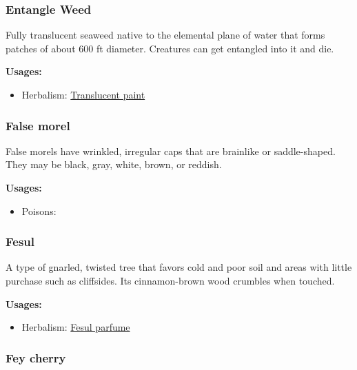 \subsubsection{Entangle Weed}
\label{Entangle Weed}

Fully translucent seaweed native to the elemental plane of water that forms patches of about 600 ft diameter. Creatures can get entangled into it and die.

\vspace{5mm}

\textbf{Usages:}

\begin{itemize}[noitemsep]
\item[] Herbalism: \hyperref[Translucent paint]{Translucent paint}
\end{itemize}

\subsubsection{False morel}
\label{False Morel}

False morels have wrinkled, irregular caps that are brainlike or saddle-shaped. They may be black, gray, white, brown, or reddish.

\vspace{5mm}

\textbf{Usages:}

\begin{itemize}[noitemsep]
\item[] Poisons: \poison
\end{itemize}


\subsubsection{Fesul}
\label{Fesul}

A type of gnarled, twisted tree that favors cold and poor soil and areas with little purchase such as cliffsides. Its cinnamon-brown wood crumbles when touched.

\vspace{5mm}

\textbf{Usages:}

\begin{itemize}[noitemsep]
\item[] Herbalism: \hyperref[Fesul parfume]{Fesul parfume}
\end{itemize}

\subsubsection{Fey cherry}
\label{Fey cherry}

